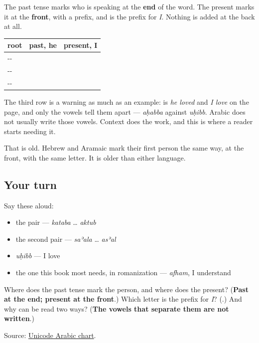 The past tense marks who is speaking at the \textbf{end} of the word. The present marks it at the \textbf{front}, with a prefix, and \textbf{} is the prefix for \emph{I}. Nothing is added at the back at all.

\begin{grammarlens}[title={Grammar Lens: the front of the word, not the back}]
\noindent
\begin{tabularx}{\linewidth}{@{}>{\raggedright\arraybackslash}X>{\raggedright\arraybackslash}X>{\raggedright\arraybackslash}X@{}}
\toprule
\textbf{root} & \textbf{past, he} & \textbf{present, I} \\
\midrule
\ar{ك}-\ar{ت}-\ar{ب} & \textbf{\ar{كتب}} & \textbf{\ar{أكتب}} \\
\ar{س}-\ar{أ}-\ar{ل} & \textbf{\ar{سأل}} & \textbf{\ar{أسأل}} \\
\ar{ح}-\ar{ب}-\ar{ب} & \textbf{\ar{أحبّ}} & \textbf{\ar{أحبّ}} \\
\bottomrule
\end{tabularx}

The third row is a warning as much as an example: \textbf{} is \emph{he loved} and \emph{I love} on the page, and only the vowels tell them apart — \emph{aḥabba} against \emph{uḥibb}. Arabic does not usually write those vowels. Context does the work, and this is where a reader starts needing it.

That \textbf{} is old. Hebrew and Aramaic mark their first person the same way, at the front, with the same letter. It is older than either language.
\end{grammarlens}

\subsection*{Your turn}
Say these aloud:

\begin{itemize}
\raggedright
  \item the pair — \emph{kataba} … \emph{aktub}
  \item the second pair — \emph{saʾala} … \emph{asʾal}
  \item \emph{uḥibb} — I love
  \item the one this book most needs, in romanization — \emph{afham}, I understand
\end{itemize}

\begin{tcolorbox}[breakable,colback=teal!4,colframe=teal!35!black,title={Before you move on}]
Where does the past tense mark the person, and where does the present? (\textbf{Past at the end; present at the front}.) Which letter is the prefix for \emph{I}? (\textbf{}.) And why can \textbf{} be read two ways? (\textbf{The vowels that separate them are not written}.)

Source: \href{https://www.unicode.org/charts/PDF/U0600.pdf}{Unicode Arabic chart}.
\end{tcolorbox}
